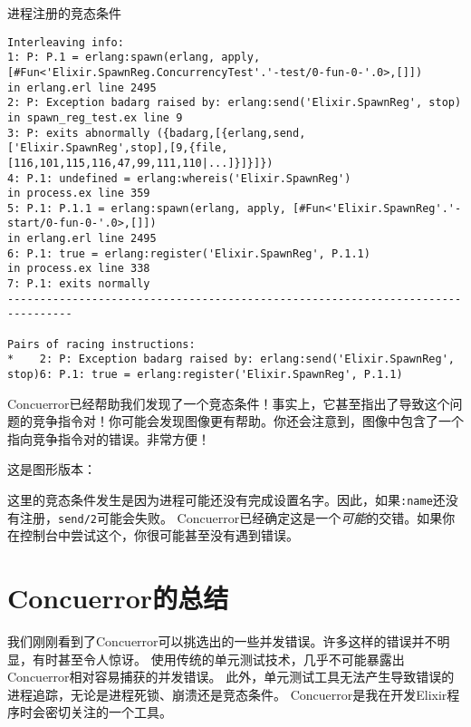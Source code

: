 \begin{example}{进程注册的竞态条件}
\begin{code}{}\begin{verbatim}
Interleaving info:
1: P: P.1 = erlang:spawn(erlang, apply, [#Fun<'Elixir.SpawnReg.ConcurrencyTest'.'-test/0-fun-0-'.0>,[]])
in erlang.erl line 2495
2: P: Exception badarg raised by: erlang:send('Elixir.SpawnReg', stop)
in spawn_reg_test.ex line 9
3: P: exits abnormally ({badarg,[{erlang,send,['Elixir.SpawnReg',stop],[9,{file,[116,101,115,116,47,99,111,110|...]}]}]})
4: P.1: undefined = erlang:whereis('Elixir.SpawnReg')
in process.ex line 359
5: P.1: P.1.1 = erlang:spawn(erlang, apply, [#Fun<'Elixir.SpawnReg'.'-start/0-fun-0-'.0>,[]])
in erlang.erl line 2495
6: P.1: true = erlang:register('Elixir.SpawnReg', P.1.1)
in process.ex line 338
7: P.1: exits normally
--------------------------------------------------------------------------------

Pairs of racing instructions:
*    2: P: Exception badarg raised by: erlang:send('Elixir.SpawnReg', stop)6: P.1: true = erlang:register('Elixir.SpawnReg', P.1.1)
\end{verbatim}
\end{code}

Concuerror已经帮助我们发现了一个竞态条件！事实上，它甚至指出了导致这个问题的竞争指令对！你可能会发现图像更有帮助。你还会注意到，图像中包含了一个指向竞争指令对的错误。非常方便！

这是图形版本：



这里的竞态条件发生是因为进程可能还没有完成设置名字。因此，如果\texttt{:name}还没有注册，\texttt{send/2}可能会失败。
Concuerror已经确定这是一个\emph{可能}的交错。如果你在控制台中尝试这个，你很可能甚至没有遇到错误。
\end{example}


\section{Concuerror的总结}

我们刚刚看到了Concuerror可以挑选出的一些并发错误。许多这样的错误并不明显，有时甚至令人惊讶。
使用传统的单元测试技术，几乎不可能暴露出Concuerror相对容易捕获的并发错误。
此外，单元测试工具无法产生导致错误的进程追踪，无论是进程死锁、崩溃还是竞态条件。
Concuerror是我在开发Elixir程序时会密切关注的一个工具。

